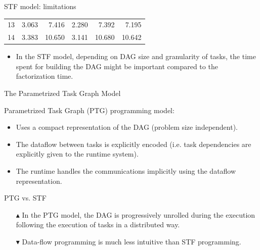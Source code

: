 \documentclass[unknownkeysallowed]{beamer}
\newcommand{\dg}[1]{\textcolor{mgreen}{#1\xspace}}
\newcommand{\dr}[1]{\textcolor{mred}{#1\xspace}}
\newcommand{\db}[1]{\textcolor{mblue}{#1\xspace}}
\newcommand{\dd}[1]{\textcolor{gray!70}{#1\xspace}}
\begin{document}
\begin{frame}{STF model: limitations}
\begin{center}
{{\begin{tabular}{r|rr|rr|r}
        13 & \dd{3.063}                 & \dd{7.416}                 & \dd{2.280} & \dd{7.392}  & \dd{7.195}  \\
        14 & \dd{3.383}                 & \dd{10.650}                & \dd{3.141} & \dd{10.680} & \dd{10.642} \\
        \hline
    \end{tabular}}}  
  \end{center}
  \begin{itemize}
  \item In the STF model, depending on \alert{DAG size} and
    \alert{granularity} of tasks, the time spent for building the DAG
    might be important compared to the factorization time.
  \end{itemize}
\end{frame}

\begin{frame}{The Parametrized Task Graph Model}
  
  \alert{Parametrized Task Graph} (PTG) programming model:

  \begin{itemize}
  \item Uses a \db{compact representation} of the DAG (problem
    size independent).
  \item The dataflow between tasks is \db{explicitly} encoded
    (i.e. task dependencies are explicitly given to the runtime
    system).
  \item The runtime handles the communications implicitly using the
    dataflow representation.
  \end{itemize}

  \alert{PTG} vs. \alert{STF}

  \begin{itemize}
  \item[\dg{$\blacktriangle$}] In the PTG model, the DAG is
    \alert{progressively} unrolled during the execution following the
    execution of tasks in a distributed way.
  \item[\dr{$\blacktriangledown$}] Data-flow programming is much less
    intuitive than STF programming.
  \end{itemize}

\end{frame}
\end{document}
